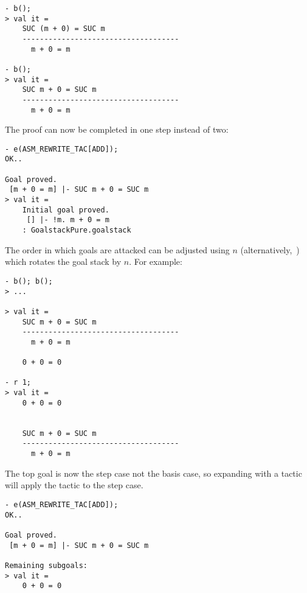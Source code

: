 \begin{session}\begin{verbatim}
- b();
> val it =
    SUC (m + 0) = SUC m
    ------------------------------------
      m + 0 = m

- b();
> val it =
    SUC m + 0 = SUC m
    ------------------------------------
      m + 0 = m

\end{verbatim}\end{session}

\noindent The proof can now be completed in one step instead of two:

\begin{session}\begin{verbatim}
- e(ASM_REWRITE_TAC[ADD]);
OK..

Goal proved.
 [m + 0 = m] |- SUC m + 0 = SUC m
> val it =
    Initial goal proved.
     [] |- !m. m + 0 = m
    : GoalstackPure.goalstack
\end{verbatim}\end{session}


    The order in which goals are attacked can be adjusted using
    $n$ (alternatively,~) which rotates the goal
    stack by $n$. For example:

\begin{session}\begin{verbatim}
- b(); b();
> ...

> val it =
    SUC m + 0 = SUC m
    ------------------------------------
      m + 0 = m

    0 + 0 = 0

- r 1;
> val it =
    0 + 0 = 0


    SUC m + 0 = SUC m
    ------------------------------------
      m + 0 = m
\end{verbatim}\end{session}

\noindent The top goal is now the step case not the basis case, so expanding
with a tactic will apply the tactic to the step case.

\begin{session}\begin{verbatim}
- e(ASM_REWRITE_TAC[ADD]);
OK..

Goal proved.
 [m + 0 = m] |- SUC m + 0 = SUC m

Remaining subgoals:
> val it =
    0 + 0 = 0
\end{verbatim}\end{session}

